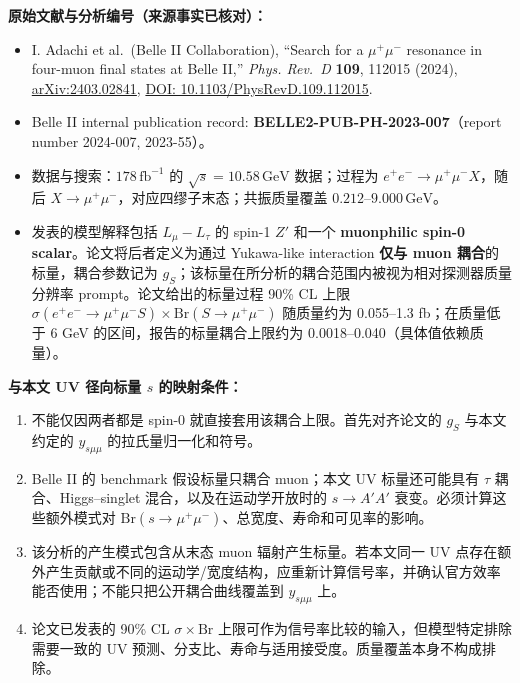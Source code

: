 \documentclass[
]{article}
\providecommand{\tightlist}{%
  \setlength{\itemsep}{0pt}\setlength{\parskip}{0pt}}
\begin{document}
\textbf{原始文献与分析编号（来源事实已核对）：}

\begin{itemize}
\tightlist
\item
  I. Adachi et al.~(Belle II Collaboration), ``Search for a
  \(\mu^+\mu^-\) resonance in four-muon final states at Belle II,''
  \emph{Phys. Rev.~D} \textbf{109}, 112015 (2024),
  \href{https://arxiv.org/abs/2403.02841}{arXiv:2403.02841},
  \href{https://doi.org/10.1103/PhysRevD.109.112015}{DOI:
  10.1103/PhysRevD.109.112015}.
\item
  Belle II internal publication record:
  \textbf{BELLE2-PUB-PH-2023-007}（report number 2024-007, 2023-55）。
\item
  数据与搜索：\(178\,\mathrm{fb}^{-1}\) 的
  \(\sqrt{s}=10.58\,\mathrm{GeV}\) 数据；过程为
  \(e^+e^-\to\mu^+\mu^-X\)，随后
  \(X\to\mu^+\mu^-\)，对应四缪子末态；共振质量覆盖
  \(0.212\text{--}9.000\,\mathrm{GeV}\)。
\item
  发表的模型解释包括 \(L_\mu-L_\tau\) 的 spin-1 \(Z'\) 和一个
  \textbf{muonphilic spin-0 scalar}。论文将后者定义为通过 Yukawa-like
  interaction \textbf{仅与 muon 耦合}的标量，耦合参数记为
  \(g_S\)；该标量在所分析的耦合范围内被视为相对探测器质量分辨率
  prompt。论文给出的标量过程 90\% CL 上限
  \(\sigma(e^+e^-\to\mu^+\mu^-S)\times\mathrm{Br}(S\to\mu^+\mu^-)\)
  随质量约为 0.055--1.3 fb；在质量低于 6 GeV
  的区间，报告的标量耦合上限约为 0.0018--0.040（具体值依赖质量）。
\end{itemize}

\textbf{与本文 UV 径向标量 \(s\) 的映射条件：}

\begin{enumerate}
\def\labelenumi{\arabic{enumi}.}
\tightlist
\item
  不能仅因两者都是 spin-0 就直接套用该耦合上限。首先对齐论文的 \(g_S\)
  与本文约定的 \(y_{s\mu\mu}\) 的拉氏量归一化和符号。
\item
  Belle II 的 benchmark 假设标量只耦合 muon；本文 UV 标量还可能具有
  \(\tau\) 耦合、Higgs--singlet 混合，以及在运动学开放时的 \(s\to A'A'\)
  衰变。必须计算这些额外模式对
  \(\mathrm{Br}(s\to\mu^+\mu^-)\)、总宽度、寿命和可见率的影响。
\item
  该分析的产生模式包含从末态 muon 辐射产生标量。若本文同一 UV
  点存在额外产生贡献或不同的运动学/宽度结构，应重新计算信号率，并确认官方效率能否使用；不能只把公开耦合曲线覆盖到
  \(y_{s\mu\mu}\) 上。
\item
  论文已发表的 90\% CL \(\sigma\times\mathrm{Br}\)
  上限可作为信号率比较的输入，但模型特定排除需要一致的 UV
  预测、分支比、寿命与适用接受度。质量覆盖本身不构成排除。
\end{enumerate}
\end{document}
